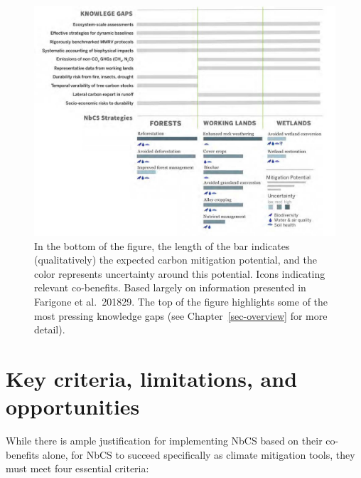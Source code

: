 \documentclass[
  letterpaper,
  DIV=11,
  numbers=noendperiod]{scrreprt}
\begin{document}
\begin{figure}

{\centering \includegraphics{img/01-nature-climate-solutions.jpg}

}

\caption{\label{fig-terrestrial-nature-solutions}In the bottom of the
figure, the length of the bar indicates (qualitatively) the expected
carbon mitigation potential, and the color represents uncertainty around
this potential. Icons indicating relevant co-benefits. Based largely on
information presented in Farigone et al.~201829. The top of the figure
highlights some of the most pressing knowledge gaps (see
Chapter~\ref{sec-overview} for more detail).}

\end{figure}

\hypertarget{key-criteria-limitations-and-opportunities}{%
\section{Key criteria, limitations, and
opportunities}\label{key-criteria-limitations-and-opportunities}}

While there is ample justification for implementing NbCS based on their
co-benefits alone, for NbCS to succeed specifically as climate
mitigation tools, they must meet four essential criteria:
\end{document}
